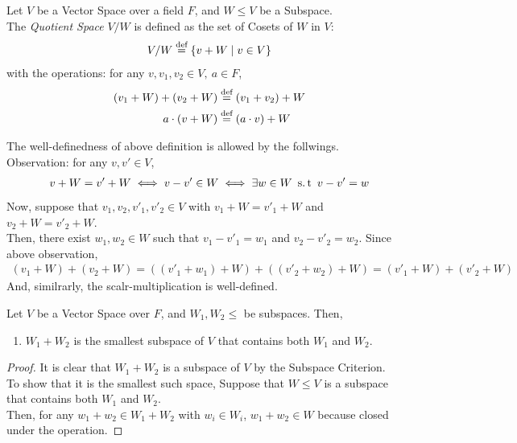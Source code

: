 \begin{definition}
    Let $V$ be a Vector Space over a field $F$, and $W \leq V$ be a Subspace. \\
    The \textit{Quotient Space} $V/W$ is defined as the set of Cosets of $W$ in $V$:
    \begin{align*}
        V/W \overset{\textnormal{def}}{=} \{v + W \mid v \in V\}
    \end{align*}
    with the operations: for any $v, v_1, v_2 \in V,\ a \in F$,
    \begin{align*}
        (v_1 + W) + (v_2 + W) &\overset{\textnormal{def}}{=} (v_1 + v_2) + W \\
        a \cdot (v + W) &\overset{\textnormal{def}}{=} (a \cdot v) + W
    \end{align*}
\end{definition}
The well-definedness of above definition is allowed by the follwings. \\
Observation: 
for any $v, v' \in V$,
\begin{align*}
    v + W = v' + W 
    \iff v - v' \in W
    \iff \exists w \in W \ \operatorname{s.t} \  v - v' = w
\end{align*}
Now, suppose that $v_1, v_2, v'_1, v'_2 \in V$ 
with $v_1 + W = v'_1 + W$ and $v_2 + W = v'_2 + W$. \\
Then, there exist $w_1, w_2 \in W$ such that $v_1 - v'_1 = w_1$ and $v_2 - v'_2 = w_2$. Since above observation,
\begin{align*}
    (v_1 + W) + (v_2 + W)
    = ((v'_1 + w_1) + W) + ((v'_2 + w_2) + W)
    = (v'_1 + W) + (v'_2 + W)
\end{align*}
And, similrarly, the scalr-multiplication is well-defined.

\begin{lemma}
    Let $V$ be a Vector Space over $F$, and $W_1, W_2 \leq $ be subspaces. Then,
    \begin{enumerate}
        \item $W_1 + W_2$ is the smallest subspace of $V$ that contains both $W_1$ and $W_2$.
    \end{enumerate}
\end{lemma}
\begin{proof}
    It is clear that $W_1 + W_2$ is a subspace of $V$ by the Subspace Criterion. \\
    To show that it is the smallest such space, Suppose that $W \leq V$ is a subspace that contains both $W_1$ and $W_2$. \\
    Then, for any $w_1 + w_2 \in W_1 + W_2$ with $w_i \in W_i$, $w_1 + w_2 \in W$ because closed under the operation.
\end{proof}

